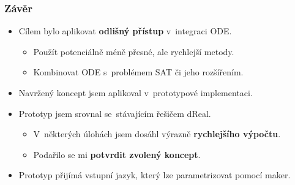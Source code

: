 \documentclass[t]{beamer}
\newcommand{\picFn}[1]{../img/#1}
\newcommand{\picL}{pic}
\newcommand{\pic}[3]{
\begin{figure}
\centering
\texttt{[image: \\picFn\{\#1]}}
\label{\picL:#2}
\end{figure}
}
\begin{document}



\begin{frame}\frametitle{Závěr}
\begin{itemize}
\item Cílem bylo aplikovat \textbf{odlišný přístup} v~integraci ODE.
   \begin{itemize}
   \item Použít potenciálně méně přesné, ale rychlejší metody.
   \item Kombinovat ODE s~problémem SAT či jeho rozšířením.
   \end{itemize}
\item Navržený koncept jsem aplikoval v~prototypové implementaci.
\item Prototyp jsem srovnal se~stávajícím řešičem dReal.
   \begin{itemize}
   \item V~některých úlohách jsem dosáhl výrazně \textbf{rychlejšího výpočtu}.
   \item Podařilo se mi \textbf{potvrdit zvolený koncept}.
   \end{itemize}
\item Prototyp přijímá vstupní jazyk, který lze parametrizovat pomocí maker.
\end{itemize}
\end{frame}





\end{document}

